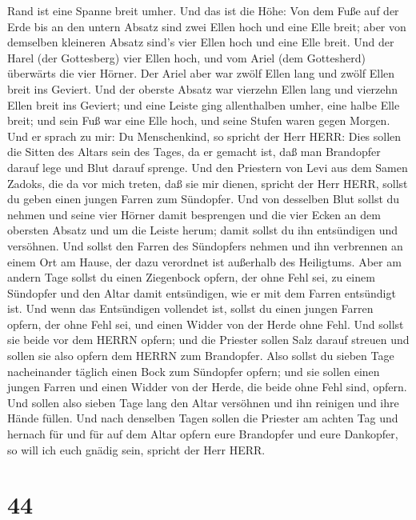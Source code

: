 Rand ist eine Spanne breit umher.  Und das ist die Höhe:
Von dem Fuße auf der Erde bis an den untern Absatz sind zwei Ellen hoch
und eine Elle breit; aber von demselben kleineren Absatz sind's vier
Ellen hoch und eine Elle breit.  Und der Harel (der
Gottesberg) vier Ellen hoch, und vom Ariel (dem Gottesherd) überwärts
die vier Hörner.  Der Ariel aber war zwölf Ellen lang und
zwölf Ellen breit ins Geviert.  Und der oberste Absatz war
vierzehn Ellen lang und vierzehn Ellen breit ins Geviert; und eine
Leiste ging allenthalben umher, eine halbe Elle breit; und sein Fuß war
eine Elle hoch, und seine Stufen waren gegen Morgen.  Und
er sprach zu mir: Du Menschenkind, so spricht der Herr HERR: Dies sollen
die Sitten des Altars sein des Tages, da er gemacht ist, daß man
Brandopfer darauf lege und Blut darauf sprenge.  Und den
Priestern von Levi aus dem Samen Zadoks, die da vor mich treten, daß sie
mir dienen, spricht der Herr HERR, sollst du geben einen jungen Farren
zum Sündopfer.  Und von desselben Blut sollst du nehmen und
seine vier Hörner damit besprengen und die vier Ecken an dem obersten
Absatz und um die Leiste herum; damit sollst du ihn entsündigen und
versöhnen.  Und sollst den Farren des Sündopfers nehmen und
ihn verbrennen an einem Ort am Hause, der dazu verordnet ist außerhalb
des Heiligtums.  Aber am andern Tage sollst du einen
Ziegenbock opfern, der ohne Fehl sei, zu einem Sündopfer und den Altar
damit entsündigen, wie er mit dem Farren entsündigt ist. 
Und wenn das Entsündigen vollendet ist, sollst du einen jungen Farren
opfern, der ohne Fehl sei, und einen Widder von der Herde ohne Fehl.
 Und sollst sie beide vor dem HERRN opfern; und die
Priester sollen Salz darauf streuen und sollen sie also opfern dem HERRN
zum Brandopfer.  Also sollst du sieben Tage nacheinander
täglich einen Bock zum Sündopfer opfern; und sie sollen einen jungen
Farren und einen Widder von der Herde, die beide ohne Fehl sind, opfern.
 Und sollen also sieben Tage lang den Altar versöhnen und
ihn reinigen und ihre Hände füllen.  Und nach denselben
Tagen sollen die Priester am achten Tag und hernach für und für auf dem
Altar opfern eure Brandopfer und eure Dankopfer, so will ich euch gnädig
sein, spricht der Herr HERR.

\hypertarget{section-43}{%
\section{44}\label{section-43}}


